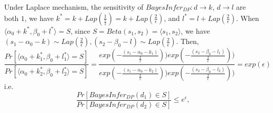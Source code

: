\documentclass{article}
\begin{document}
Under Laplace mechanism, the sensitivity of $BayesInfer_{DP}: d \rightarrow k$, $d \rightarrow l$ are both $1$, we have $k^* = k + Lap(\frac{1}{\frac{\epsilon}{2}}) = k + Lap(\frac{2}{\epsilon})$, and $l^* = l + Lap(\frac{2}{\epsilon})$. When $\langle \alpha_0 + k^*, \beta_0 + l^* \rangle = S$, since $S = Beta(s_1,s_2) = \langle s_1, s_2 \rangle $, we have $ (s_1 - \alpha_0  - k) \sim Lap(\frac{2}{\epsilon}), (s_2 - \beta_0 - l) \sim Lap(\frac{2}{\epsilon})$. Then,
\begin{equation*}
\frac{Pr[\langle \alpha_0 + k^*_1, \beta_0 + l^*_1 \rangle = S]}{Pr[\langle \alpha_0 + k^*_2, \beta_0 + l^*_2 \rangle = S]} = \frac{exp(-\frac{(s_1 - \alpha_0  - k_1)}{\frac{2}{\epsilon}})) exp(-\frac{(s_2 - \beta_0  - l_1)}{\frac{2}{\epsilon}}))}{exp(-\frac{(s_1 - \alpha_0  - k_2)}{\frac{2}{\epsilon}})) exp(-\frac{(s_2 - \beta_0  - l_2)}{\frac{2}{\epsilon}}))} = exp(\epsilon)
\end{equation*}
i.e.
\begin{equation*}
\frac{Pr[BayesInfer_{DP}(d_1) \in S]}{Pr[BayesInfer_{DP}(d_2) \in S]} \leq e^{\epsilon},
\end{equation*}



% 

% 

\end{document}
